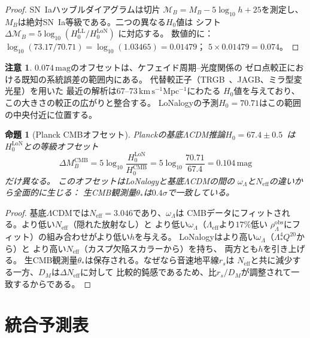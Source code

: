 \documentclass[12pt]{article}
\theoremstyle{plain}
\newtheorem{proposition}[theorem]{命題}
\theoremstyle{definition}
\newtheorem{remark}[theorem]{注意}
\numberwithin{equation}{section}
\newcommand{\eff}{\mathrm{eff}}
\newcommand{\obs}{\mathrm{obs}}
\newcommand{\LoN}{\mathrm{LoN}}
\begin{document}
\begin{proof}
SN~Iaハッブルダイアグラムは切片
$\mathcal{M}_B=M_B-5\log_{10}h+25$を測定し、
$M_B$は絶対SN~Ia等級である。二つの異なる$H_0$値は
シフト$\Delta\mathcal{M}_B=5\log_{10}(H_0^{\mathrm{LL}}/H_0^{\LoN})$
に対応する。
数値的に：$\log_{10}(73.17/70.71)=\log_{10}(1.03465)=0.01479$；
$5\times0.01479=0.074$。
\end{proof}

\begin{remark}
$0.074\,\mathrm{mag}$のオフセットは、ケフェイド周期--光度関係の
ゼロ点較正における既知の系統誤差の範囲内にある。
代替較正子（TRGB~\cite{Freedman2021}、JAGB、ミラ型変光星）を用いた
最近の解析は$67$--$73\,\mathrm{km\,s^{-1}Mpc^{-1}}$にわたる
$H_0$値を与えており、この大きさの較正の広がりと整合する。
LoNalogyの予測$H_0=70.71$はこの範囲の中央付近に位置する。
\end{remark}

\begin{proposition}[Planck CMBオフセット]\label{prop:CMBoffset}
Planckの基底$\Lambda$CDM推論$H_0=67.4\pm0.5$~\cite{Planck2018}は
$H_0^{\LoN}$との等級オフセット
\begin{equation}
\Delta M_B^{\mathrm{CMB}} = 5\log_{10}\frac{H_0^{\LoN}}{H_0^{\mathrm{CMB}}}
= 5\log_{10}\frac{70.71}{67.4} = 0.104\,\mathrm{mag}
\end{equation}
だけ異なる。
このオフセットはLoNalogyと基底$\Lambda$CDMの間の
$\omega_\Lambda$と$N_{\eff}$の違いから全面的に生じる：
生CMB観測量$\theta_*$は$0.4\sigma$で一致している。
\end{proposition}

\begin{proof}
基底$\Lambda$CDMでは$N_{\eff}=3.046$であり、$\omega_\Lambda$は
CMBデータにフィットされる。より低い$N_{\eff}$（隠れた放射なし）と
より低い$\omega_\Lambda$（$\Lambda_{\eff}$より$17\%$低い
$\rho_\Lambda^{\obs}$にフィット）の組み合わせがより低い$h$を与える。
LoNalogyはより高い$\omega_\Lambda$（$\Lambda_*^4Q^{20}$から）と
より高い$N_{\eff}$（カスプ欠陥スカラーから）を持ち、
両方とも$h$を引き上げる。
生CMB観測量$\theta_*$は保存される。なぜなら音速地平線$r_s$は
$N_{\eff}$と共に減少する一方、$D_M$は$\Delta N_{\eff}$に対して
比較的鈍感であるため、比$r_s/D_M$が調整されて一致するからである。
\end{proof}


\section*{統合予測表}
\end{document}
